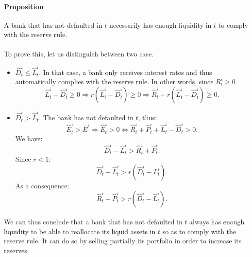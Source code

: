 \documentclass{article}
\newcommand{\othernote}[1]{\textcolor{darkgreen}{\textit{Dimitri: #1}}}
\newcommand{\wh}{\widehat}
\begin{document}

\paragraph{Proposition} A bank that has not defaulted in $t$ necessarily has enough liquidity in $t$ to comply with the reserve rule.

\paragraph{}
To prove this, let us distinguish between two case.
\begin{itemize}
    \item $\widehat D^i_t \leq \widehat L^i_t$. In that case, a bank only receives interest rates and thus automatically complies with the reserve rule. In other words, since $R_t^i \geq 0$
    $$ \widehat L_t^i - \widehat D_t^i \geq 0 \Rightarrow r(\widehat L_t^i - \widehat D_t^i) \geq 0 \Rightarrow \widehat R_t^i + r(\widehat L_t^i - \widehat D_t^i) \geq 0.$$
    \item $\widehat D^i_t > \widehat L^i_t$. The bank has not defaulted in $t$, thus:
    $$\widehat E^i_t > \bar{E}^i \Rightarrow \widehat E^i_t > 0 \Leftrightarrow \widehat{R}^i_t + \widehat{P}^i_t + \widehat L^i_t - \widehat D^i_t > 0.$$
    We have:
    $$\widehat D^i_t - \widehat L^i_t > \widehat{R}^i_t + \widehat{P}^i_t.$$
    Since $ r < 1$:
    $$ \widehat{D}^i_t - \widehat L^i_t > r(\widehat D^i_t - L^i_t).$$
    As a consequence: 
    $$ \widehat{R}^i_t + \widehat{P}^i_t > r(\wh D^i_t - \wh L^i_t).$$
\end{itemize}

\paragraph{}
We can thus conclude that a bank that has not defaulted in $t$ always has enough liquidity to be able to reallocate its liquid assets in $t$ so as to comply with the reserve rule. It can do so by selling partially its portfolio in order to increase its reserves.
\end{document}
